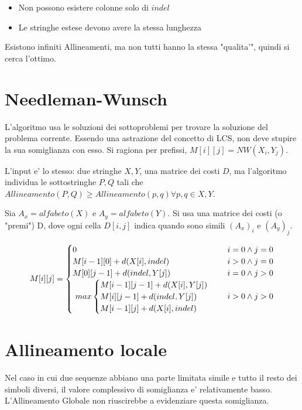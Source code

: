 \begin{itemize}
\item Non possono esistere colonne solo di $indel$
\item Le stringhe estese devono avere la stessa lunghezza
\end{itemize}

Esistono infiniti Allineamenti, ma non tutti hanno la stessa "qualita'", quindi si cerca l'ottimo.

\section{Needleman-Wunsch}

L'algoritmo usa le soluzioni dei sottoproblemi per trovare la soluzione del problema corrente.
Essendo una astrazione del concetto di LCS, non deve stupire la sua somiglianza con esso.
Si ragiona per prefissi, $M[i][j] = NW(X_i, Y_j)$.

L'input e' lo stesso: due stringhe $X, Y$, una matrice dei costi $D$, ma l'algoritmo individua le sottostringhe $P, Q$ tali che $Allineamento(P, Q) \geq Allineamento(p, q) \forall p,q \in X, Y$.

Sia $A_x = alfabeto(X)$ e $A_y = alfabeto(Y)$. Si usa una matrice dei costi (o "premi") D, dove ogni cella $D[i,j]$ indica quando sono simili $(A_x)_i$ e $(A_y)_j$.

\[
M[i][j] =
\begin{cases}
  \text{$0$} & \text{$i = 0 \land j = 0$} \\
  \text{$M[i-1][0] + d(X[i], indel)$} & \text{$i > 0 \land j = 0$} \\
  \text{$M[0][j-1] + d(indel, Y[j])$} & \text{$i = 0 \land j > 0$} \\
  \text{
    $
    max 
    \begin{cases}
      M[i-1][j-1] + d(X[i], Y[j]) \\
      M[i][j-1] + d(indel, Y[j]) \\
      M[i-1][j] + d(X[i], indel) \\
    \end{cases}
    $
  } & \text{$i > 0 \land j > 0$}
\end{cases}
\]

\section{Allineamento locale}

Nel caso in cui due sequenze abbiano una parte limitata simile e tutto il resto dei simboli diversi, il valore complessivo di somiglianza e' relativamente basso.
L'Allineamento Globale non riuscirebbe a evidenziare questa somiglianza.

